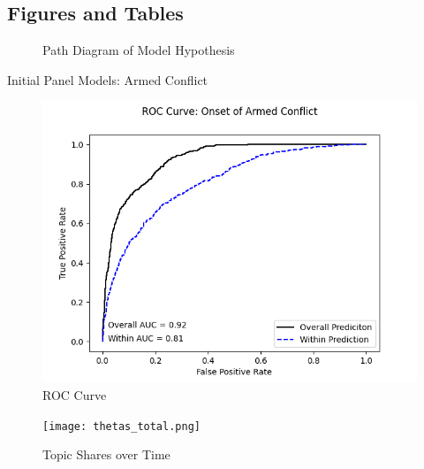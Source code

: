 \begin{appendix}
    \section{Figures and Tables}
    

    \clearpage
    \newpage

    \begin{figure}[!h]
        \caption{Path Diagram of Model Hypothesis}
        \centering
        
        \label{path}
    \end{figure}

    \clearpage
    \newpage

    \begin{table}[!h]
        \caption{Initial Panel Models: Armed Conflict}
        \centering
        
        \label{tab::armed}
    \end{table}

    \begin{figure}[!h]
        \centering
        \includegraphics{ROC_FE.png}
        \caption{ROC Curve}
        \label{rocfe}
    \end{figure}


    \clearpage
    \newpage

    \begin{figure}[!h]
        \centering
        \texttt{[image: thetas\_total.png]}
        \caption{Topic Shares over Time}
        \label{tstopics}
    \end{figure}

\end{appendix}

